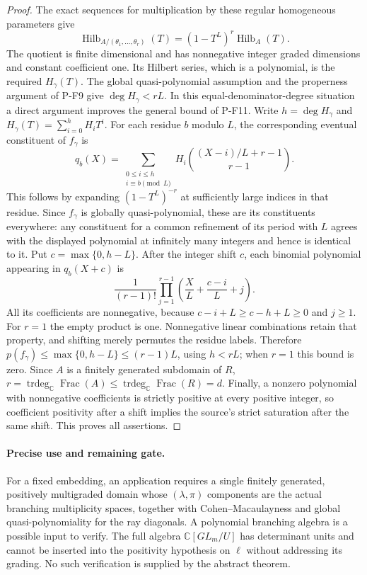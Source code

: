 \begin{proof}
The exact sequences for multiplication by these regular homogeneous
parameters give
\[
 \operatorname{Hilb}_{A/(\theta_1,\ldots,\theta_r)}(T)
 =(1-T^L)^r\operatorname{Hilb}_{A}(T).
\]
The quotient is finite dimensional and has nonnegative integer graded
dimensions and constant coefficient one. Its Hilbert series, which
is a polynomial, is the required $H_\gamma(T)$. The global quasi-polynomial assumption
and the properness argument of P-F9 give
$\deg H_\gamma<rL$.
In this equal-denominator-degree situation a direct argument improves
the general bound of P-F11. Write $h=\deg H_\gamma$ and
$H_\gamma(T)=\sum_{i=0}^h H_iT^i$.
For each residue $b$ modulo $L$, the corresponding eventual constituent
of $f_\gamma$ is
\[
 q_b(X)=\sum_{\substack{0\le i\le h\\i\equiv b\pmod L}}
 H_i\binom{(X-i)/L+r-1}{r-1}.
\]
This follows by expanding $(1-T^L)^{-r}$ at sufficiently large
indices in that residue. Since $f_\gamma$ is globally
quasi-polynomial, these are its constituents everywhere: any
constituent for a common refinement of its period with $L$ agrees
with the displayed polynomial at infinitely many integers and hence
is identical to it. Put $c=\max\{0,h-L\}$. After the integer shift
$c$, each binomial polynomial appearing in $q_b(X+c)$ is
\[
 \frac{1}{(r-1)!}\prod_{j=1}^{r-1}
 \left(\frac{X}{L}+\frac{c-i}{L}+j\right).
\]
All its coefficients are nonnegative, because
$c-i+L\ge c-h+L\ge0$ and $j\ge1$.
For $r=1$ the empty product is one. Nonnegative linear combinations
retain that property, and shifting merely permutes the residue
labels. Therefore $p(f_\gamma)\le\max\{0,h-L\}\le(r-1)L$,
using $h<rL$; when $r=1$ this bound is zero.
Since $A$ is a finitely generated subdomain of $R$,
$r=\operatorname{trdeg}_\mathbb C\operatorname{Frac}(A)
\le\operatorname{trdeg}_\mathbb C\operatorname{Frac}(R)=d$.
Finally, a nonzero polynomial with nonnegative coefficients is
strictly positive at every positive integer, so coefficient positivity
after a shift implies the source's strict saturation after the same
shift. This proves all assertions.
\end{proof}

\paragraph{Precise use and remaining gate.}
For a fixed embedding, an application requires a single finitely
generated, positively multigraded domain whose $(\lambda,\pi)$
components are the actual branching multiplicity spaces, together with
Cohen--Macaulayness and global quasi-polynomiality for the ray diagonals.
A polynomial branching algebra is a possible input to verify.
The full algebra $\mathbb C[GL_m/U]$ has determinant units and cannot
be inserted into the positivity hypothesis on $\ell$ without addressing
its grading. No such verification is supplied by the abstract theorem.


